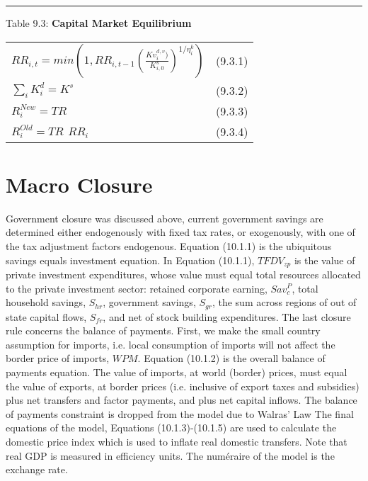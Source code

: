 \documentclass[12pt]{article}
\begin{document}
\newpage

\noindent\rule{\linewidth}{0.4pt}

\begin{center}
\begin{large}
{\centering Table 9.3: \textbf{Capital Market Equilibrium} \par}


\begin{tabular}{>{\raggedright}p{} l}


$RR_{i, t}= min\left(1, RR_{i, t-1}\left(\frac{Kv^{d, v}_i)}{K^s_{i, 0}}\right)^{1/{\eta^k_i}}\right)$ & (9.3.1) \\[15pt]

$\displaystyle \sum_i K^d_i = K^s$ & (9.3.2) \\[15pt]

$R^{New}_i = TR$ & (9.3.3) \\[15pt]

$R^{Old}_i = TR\hspace{5pt}RR_i$ & (9.3.4) \\[20pt]

\hline
\end{tabular}
\end{large}
\end{center}

\section{Macro Closure}

Government closure was discussed above, current government savings are determined either endogenously with fixed tax rates, or exogenously, with one of the tax adjustment factors endogenous.
Equation (10.1.1) is the ubiquitous savings equals investment equation. In Equation (10.1.1), $TFDV_{zp}$ is the value of private investment expenditures, whose value must equal total resources allocated to the private investment sector:  retained corporate earning, $Sav^P_c$, total household savings, $S_{hr}$, government savings, $S_{gr}$, the sum across regions of out of state capital flows, $S_{fr}$, and net of stock building expenditures.
The last closure rule concerns the balance of payments. First, we make the small country assumption for imports, i.e. local consumption of imports will not affect the border price of imports, $WPM$. Equation (10.1.2) is the overall balance of payments equation. The value of imports, at world (border) prices, must equal the value of exports, at border prices (i.e. inclusive of export taxes and subsidies) plus net transfers and factor payments, and plus net capital inflows. The balance of payments constraint is dropped from the model due to Walras’ Law
The final equations of the model, Equations (10.1.3)-(10.1.5) are used to calculate the domestic price index which is used to inflate real domestic transfers. Note that real GDP is measured in efficiency units. The numéraire of the model is the exchange rate.
\end{document}
